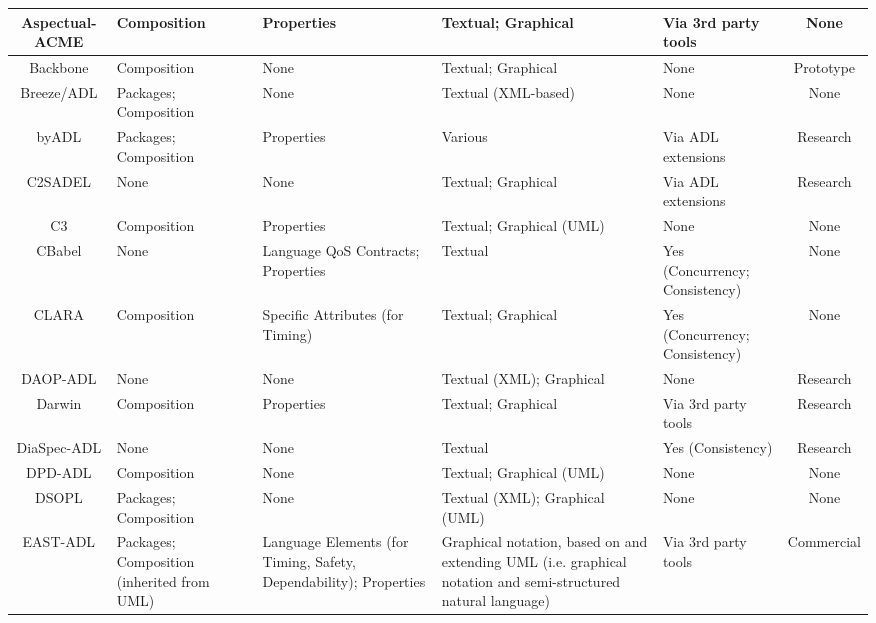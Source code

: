 \begin{landscape}
\begin{longtable}{|c|P{2cm}|P{3cm}|P{3cm}|p{2cm}|c|}
Aspectual-ACME & Composition & Properties & Textual; Graphical & Via 3rd party tools & None \\ 
\hline

Backbone & Composition & None & Textual; Graphical & None & Prototype \\ 
\hline

Breeze/ADL & Packages; Composition & None & Textual (XML-based) & None & None \\ 
\hline

byADL & Packages; Composition & Properties & Various & Via ADL extensions & Research \\ 
\hline

C2SADEL & None & None & Textual; Graphical & Via ADL extensions & Research \\ 
\hline

C3 & Composition & Properties & Textual; Graphical (UML) & None & None \\ 
\hline

CBabel & None & Language QoS Contracts; Properties & Textual & Yes (Concurrency; Consistency) & None \\ 
\hline

CLARA & Composition & Specific Attributes (for Timing) & Textual; Graphical & Yes (Concurrency; Consistency) & None \\ 
\hline

DAOP-ADL & None & None & Textual (XML); Graphical & None & Research \\ 
\hline

Darwin & Composition & Properties & Textual; Graphical & Via 3rd party tools & Research \\ 
\hline

DiaSpec-ADL & None & None & Textual & Yes (Consistency) & Research \\ 
\hline

DPD-ADL & Composition & None & Textual; Graphical (UML) & None & None \\ 
\hline

DSOPL & Packages; Composition & None & Textual (XML); Graphical (UML) & None & None \\ 
\hline

EAST-ADL & Packages; Composition (inherited from UML) & Language Elements (for Timing, Safety, Dependability); Properties & Graphical notation, based on and extending UML (i.e. graphical notation and semi-structured natural language) & Via 3rd party tools & Commercial \\ 
\hline


\end{longtable}
\end{landscape}
